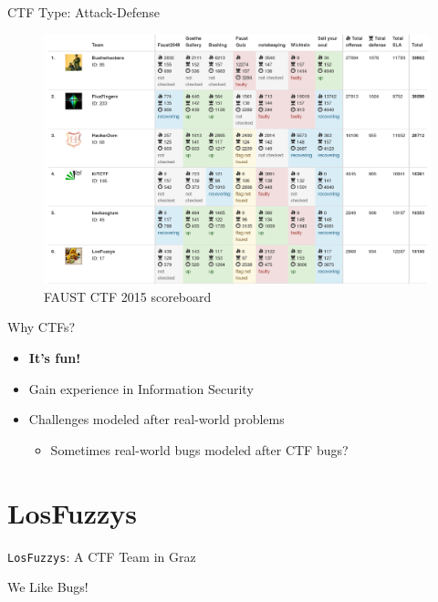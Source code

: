\begin{frame}
  {CTF Type: Attack-Defense}

  \begin{figure}[h]
    \centering
    \includegraphics[width=\textwidth]{../images/faustctf-scoreboard.png}
    \caption{\footnotesize{}FAUST CTF 2015 scoreboard}
    \label{fig:faustctfscoreboard}
  \end{figure}

\end{frame}


\begin{frame}
  {Why CTFs?}

  \begin{itemize}
    \item \textbf{It's fun!}
    \item Gain experience in Information Security
    \item Challenges modeled after real-world problems
      \begin{itemize}
        \item Sometimes real-world bugs modeled after CTF bugs?
      \end{itemize}
  \end{itemize}
\end{frame}

\section{LosFuzzys}

{
\begin{frame}

  {\huge
    \texttt{LosFuzzys}: A CTF Team in Graz}

  \vspace{19em}

  {\Large
  We Like Bugs!}

\end{frame}
}

